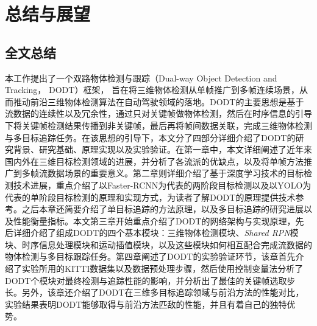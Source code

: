 \chapter{总结与展望}
\label{conclusion}

\section{全文总结}
\label{summary}
本工作提出了一个双路物体检测与跟踪（Dual-way Object Detection and Tracking， DODT）框架， 旨在将三维物体检测从单帧推广到多帧连续场景，从而推动前沿三维物体检测算法在自动驾驶领域的落地。DODT的主要思想是基于流数据的连续性以及冗余性，通过只对关键帧做物体检测，然后在时序信息的引导下将关键帧检测结果传播到非关键帧，最后再将帧间数据关联，完成三维物体检测与多目标追踪任务。在该思想的引导下，本文分了四部分详细介绍了DODT的研究背景、研究基础、原理实现以及实验验证。在第一章中，本文详细阐述了近年来国内外在三维目标检测领域的进展，并分析了各流派的优缺点，以及将单帧方法推广到多帧流数据场景的重要意义。第二章则详细介绍了基于深度学习技术的目标检测技术进展，重点介绍了以Faster-RCNN为代表的两阶段目标检测以及以YOLO为代表的单阶段目标检测的原理和实现方式，为读者了解DODT的原理提供技术参考。之后本章还简要介绍了单目标追踪的方法原理，以及多目标追踪的研究进展以及性能衡量指标。本文第三章开始重点介绍了DODT的网络架构与实现原理，先后详细介绍了组成DODT的四个基本模块：三维物体检测模块、\textit{Shared RPN}模块、时序信息处理模块和运动插值模块，以及这些模块如何相互配合完成流数据的物体检测与多目标跟踪任务。第四章阐述了DODT的实验验证环节，该章首先介绍了实验所用的KITTI数据集以及数据预处理步骤，然后使用控制变量法分析了DODT个模块对最终检测与追踪性能的影响，并分析出了最佳的关键帧选取步长。另外，该章还介绍了DODT在三维多目标追踪领域与前沿方法的性能对比，实验结果表明DODT能够取得与前沿方法匹敌的性能，并且有着自己的独特优势。


